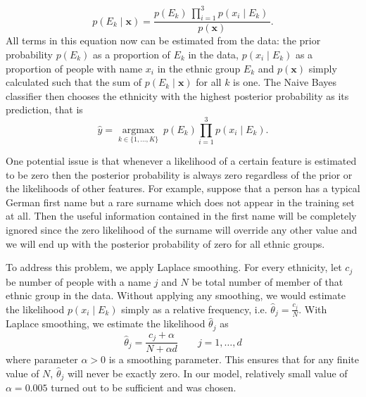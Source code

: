 \begin{equation}
p(E_k \mid \mathbf{x}) = \frac{p(E_k) \  \prod_{i=1}^3 p(x_i \mid E_k)\,}{p(\mathbf{x})}.
\end{equation}
 All terms in this equation now can be estimated from the data: the prior probability $p(E_k)$ as a proportion of $E_k$ in the data, $p(x_i \mid E_k)$ as a proportion of people with name $x_i$ in the ethnic group $E_k$ and $p(\mathbf{x})$ simply calculated such that the sum of $p(E_k \mid \mathbf{x})$ for all $k$ is one. 
The Naive Bayes classifier then chooses the ethnicity with the highest posterior probability as its prediction, that is
\begin{equation}
    \hat{y} = \underset{k \in \{1, \dots, K\}}{\operatorname{argmax}} \ p(E_k) \displaystyle\prod_{i=1}^{3} p(x_i \mid E_k).
\end{equation}

One potential issue is that whenever a likelihood of a certain feature is estimated to be zero then the posterior probability is always zero regardless of the prior  or the likelihoods of other features. For example, suppose that a person has a typical German first name but a rare surname which does not appear in the training set at all. 
Then the useful information contained in the first name will be completely ignored since the zero likelihood of the surname will override any other value and we will end up with the posterior probability of zero for all ethnic groups.

To address this problem, we apply Laplace smoothing. 
For every ethnicity, let $c_j$ be number of people with a name $j$ and $N$ be total number of member of that ethnic group in the data.  Without applying any smoothing, we would estimate the likelihood  $p(x_i \mid E_k)$ simply as a relative frequency, i.e. $\hat\theta_j = \frac{c_j}{N}$. With  Laplace smoothing, we estimate  the  likelihood $\hat\theta_j$ as 
\begin{equation}
    \hat\theta_j = \frac{c_j + \alpha}{N + \alpha d} \qquad j = 1, \dots, d
\end{equation}
where parameter $\alpha > 0 $ is a smoothing parameter.  This ensures that for any finite value of $N$,  $\hat\theta_j$ will never be exactly zero. %
In our model, relatively small value of  $\alpha = 0.005 $  turned out to be sufficient and  was chosen. 

